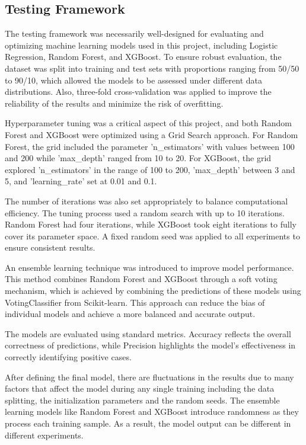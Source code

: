 \documentclass[conference]{IEEEtran}
\begin{document}
\subsection{Testing Framework}

The testing framework was necessarily well-designed for evaluating and optimizing machine learning models used in this project, including Logistic Regression, Random Forest, and XGBoost. To ensure robust evaluation, the dataset was split into training and test sets with proportions ranging from 50/50 to 90/10, which allowed the models to be assessed under different data distributions. Also, three-fold cross-validation was applied to improve the reliability of the results and minimize the risk of overfitting.

Hyperparameter tuning was a critical aspect of this project, and both Random Forest and XGBoost were optimized using a Grid Search approach. For Random Forest, the grid included the parameter 'n\_estimators' with values between 100 and 200 while 'max\_depth' ranged from 10 to 20. For XGBoost, the grid explored 'n\_estimators' in the range of 100 to 200, 'max\_depth' between 3 and 5, and 'learning\_rate' set at 0.01 and 0.1. 

The number of iterations was also set appropriately to balance computational efficiency. The tuning process used a random search with up to 10 iterations. Random Forest had four iterations, while XGBoost took eight iterations to fully cover its parameter space. A fixed random seed was applied to all experiments to ensure consistent results.

An ensemble learning technique was introduced to improve model performance. This method combines Random Forest and XGBoost through a soft voting mechanism, which is achieved by combining the predictions of these models using VotingClassifier from Scikit-learn. This approach can reduce the bias of individual models and achieve a more balanced and accurate output.

The models are evaluated using standard metrics. Accuracy reflects the overall correctness of predictions, while Precision highlights the model's effectiveness in correctly identifying positive cases.

After defining the final model, there are fluctuations in the results due to many factors that affect the model during any single training including the data splitting, the initialization parameters and the random seeds. The ensemble learning models like Random Forest and XGBoost introduce randomness as they process each training sample. As a result, the model output can be different in different experiments.
\end{document}
